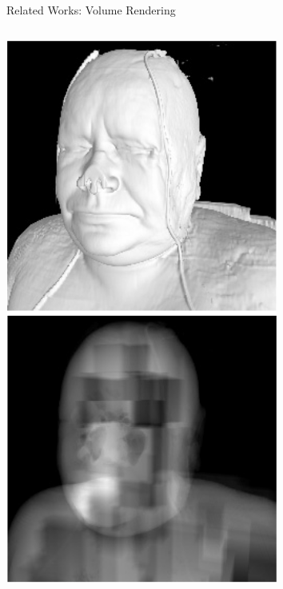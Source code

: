 \documentclass[10pt,compress,professionalfont]{beamer}
\begin{document}
\begin{frame}{Related Works: Volume Rendering}
\begin{columns}
\begin{column}{0.3\textwidth}
            \includegraphics[width=\textwidth]{../img/external/vol_multi_res}\\
        \end{column}
    \end{columns}

\end{frame}
\end{document}
